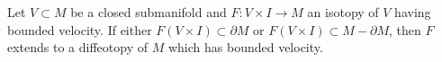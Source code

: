 Let $V \subset M$ be a closed submanifold and $F: V \times I \to M$ an isotopy of $V$ having bounded velocity. If either $F(V \times I) \subset \partial M$ or $F(V \times I) \subset M - \partial M$, then $F$ extends to a diffeotopy of $M$ which has bounded velocity.
